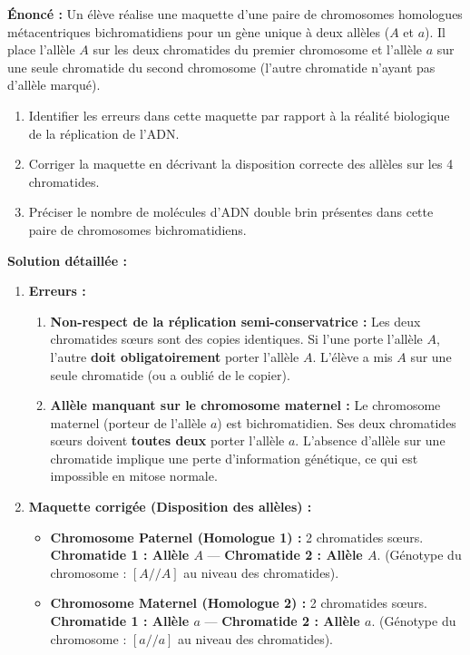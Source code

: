 \documentclass[11pt]{article}
\begin{document}
\begin{exoresolu}
\textbf{Énoncé :} Un élève réalise une maquette d'une paire de chromosomes homologues métacentriques bichromatidiens pour un gène unique à deux allèles ($A$ et $a$). Il place l'allèle $A$ sur les deux chromatides du premier chromosome et l'allèle $a$ sur une seule chromatide du second chromosome (l'autre chromatide n'ayant pas d'allèle marqué).
\begin{enumerate}
    \item Identifier les erreurs dans cette maquette par rapport à la réalité biologique de la réplication de l'ADN.
    \item Corriger la maquette en décrivant la disposition correcte des allèles sur les 4 chromatides.
    \item Préciser le nombre de molécules d'ADN double brin présentes dans cette paire de chromosomes bichromatidiens.
\end{enumerate}
\tcblower
\textbf{Solution détaillée :}
\begin{enumerate}
    \item \textbf{Erreurs :}
        \begin{enumerate}
            \item \textbf{Non-respect de la réplication semi-conservatrice :} Les deux chromatides sœurs sont des copies identiques. Si l'une porte l'allèle $A$, l'autre \textbf{doit obligatoirement} porter l'allèle $A$. L'élève a mis $A$ sur une seule chromatide (ou a oublié de le copier).
            \item \textbf{Allèle manquant sur le chromosome maternel :} Le chromosome maternel (porteur de l'allèle $a$) est bichromatidien. Ses deux chromatides sœurs doivent \textbf{toutes deux} porter l'allèle $a$. L'absence d'allèle sur une chromatide implique une perte d'information génétique, ce qui est impossible en mitose normale.
        \end{enumerate}
    \item \textbf{Maquette corrigée (Disposition des allèles) :}
        \begin{itemize}
            \item \textbf{Chromosome Paternel (Homologue 1) :} 2 chromatides sœurs. \textbf{Chromatide 1 : Allèle $A$} — \textbf{Chromatide 2 : Allèle $A$}. (Génotype du chromosome : $[A//A]$ au niveau des chromatides).
            \item \textbf{Chromosome Maternel (Homologue 2) :} 2 chromatides sœurs. \textbf{Chromatide 1 : Allèle $a$} — \textbf{Chromatide 2 : Allèle $a$}. (Génotype du chromosome : $[a//a]$ au niveau des chromatides).

\end{itemize}
\end{enumerate}
\end{exoresolu}
\end{document}
